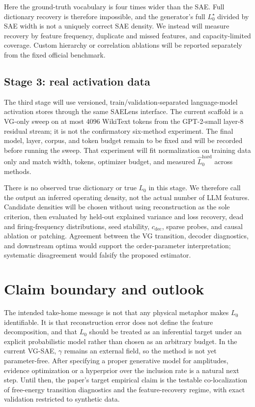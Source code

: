 \documentclass[aps,pre,reprint,superscriptaddress,amsmath,amssymb,nofootinbib]{revtex4-2}
\begin{document}
Here the ground-truth vocabulary is four times wider than the SAE\@.  Full
dictionary recovery is therefore impossible, and the generator's full
$L_0^\star$ divided by SAE width is not a uniquely correct SAE density.  We instead
will measure recovery by feature frequency, duplicate and missed features, and
capacity-limited coverage.  Custom hierarchy or correlation ablations will be
reported separately from the fixed official benchmark.

\subsection{Stage 3: real activation data}

The third stage will use versioned, train/validation-separated language-model
activation stores through the same SAELens interface.  The current scaffold is
a VG-only sweep on at most 4096 WikiText tokens from the GPT-2-small layer-8
residual stream; it is not the confirmatory six-method experiment.  The final
model, layer, corpus, and token budget remain to be fixed and will be recorded
before running the sweep.  That experiment will fit normalization on training
data only and match width, tokens, optimizer budget, and measured
$\widehat L_0^{\mathrm{hard}}$ across methods.

There is no observed true dictionary or true $L_0$ in this stage.  We therefore
call the output an inferred operating density, not the actual number of LLM
features.  Candidate densities will be chosen without using reconstruction as
the sole criterion, then evaluated by held-out explained variance and loss
recovery, dead and firing-frequency distributions, seed stability,
$c_{\mathrm{dec}}$, sparse probes, and causal ablation or patching.  Agreement
between the VG transition, decoder diagnostics, and downstream optima would
support the order-parameter interpretation; systematic disagreement would
falsify the proposed estimator.

\section{Claim boundary and outlook}

The intended take-home message is not that any physical metaphor makes
$L_0$ identifiable.  It is that reconstruction error does not define the
feature decomposition, and that $L_0$ should be treated as an inferential
target under an explicit probabilistic model rather than chosen as an
arbitrary budget.  In the current
VG-SAE, $\gamma$ remains an external field, so the method is not yet
parameter-free.  After specifying a proper generative model for amplitudes,
evidence optimization or a hyperprior over the inclusion rate is a natural
next step.  Until then, the paper's target empirical claim
is the testable co-localization of free-energy transition diagnostics and the
feature-recovery regime, with exact validation restricted to synthetic data.


\end{document}
